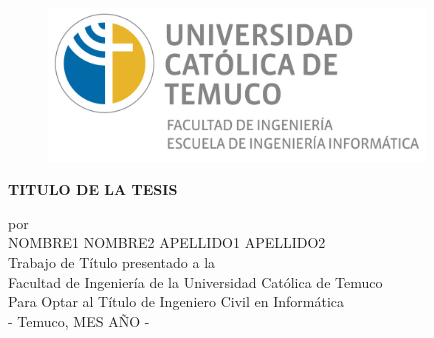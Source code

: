 \thispagestyle{empty}
\begin{titlepage}

\begin{center}

\vspace*{-1in}
\begin{figure}[htb]
  \begin{flushleft}
    \includegraphics[width=10cm]{./figuras/logo_informatica.jpg}
  \end{flushleft}
\end{figure}

{
\vspace*{4cm}
\textbf{ \large{TITULO DE LA TESIS}} \\
\vspace*{2.0in}
}

\normalsize{por} \\
\vspace*{0.1in}
\normalsize{NOMBRE1 NOMBRE2 APELLIDO1 APELLIDO2} \\
\vspace*{1.3in}
\normalsize{Trabajo de Título presentado a la  \\ Facultad de Ingeniería de la Universidad Católica de Temuco  \\ Para Optar al Título de Ingeniero Civil en Informática \\}
\vspace*{0.5in}
\normalsize{- Temuco, MES AÑO -}
\end{center}

\end{titlepage}
